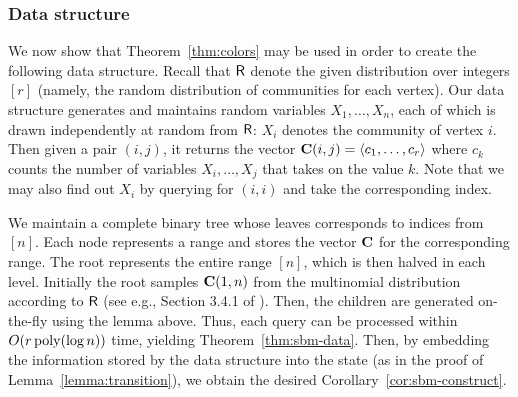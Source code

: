 \subsubsection{Data structure}
We now show that Theorem~\ref{thm:colors} may be used in order to create the following data structure. Recall that $\mathsf{R}$ denote the given distribution over integers $[r]$ (namely, the random distribution of communities for each vertex). Our data structure generates and maintains random variables $X_1, \ldots, X_n$, each of which is drawn independently at random from $\mathsf{R}$: $X_i$ denotes the community of vertex $i$. Then given a pair $(i, j)$, it returns the vector $\mathbf{C}(i, j) = \langle c_1, \ldots, c_r \rangle$ where $c_k$ counts the number of variables $X_i, \ldots, X_j$ that takes on the value $k$. Note that we may also find out $X_i$ by querying for $(i, i)$ and take the corresponding index.

We maintain a complete binary tree whose leaves corresponds to indices from $[n]$.
Each node represents a range and stores the vector $\mathbf{C}$ for the corresponding range.
The root represents the entire range $[n]$, which is then halved in each level.
Initially the root samples $\mathbf{C}(1, n)$ from the multinomial distribution according to $\mathsf{R}$
(see e.g., Section 3.4.1 of \cite{knuth}).
Then, the children are generated on-the-fly using the lemma above.
Thus, each query can be processed within $O(r\,\mathrm{poly}(\log n))$ time, yielding Theorem~\ref{thm:sbm-data}.
Then, by embedding the information stored by the data structure into the state (as in the proof of Lemma~\ref{lemma:transition}),
we obtain the desired Corollary~\ref{cor:sbm-construct}.
